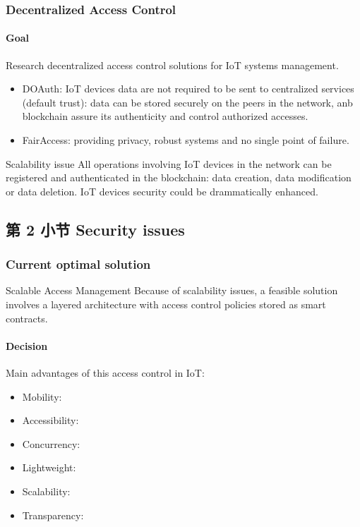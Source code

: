 \documentclass[
    aspectratio=169,                   %
]{beamer}
\begin{document}
    \begin{frame}
        \frametitle{Decentralized Access Control}
        
        \paragraph{Goal} Research decentralized access control solutions for IoT systems management.\cite{ouaddah}

        \begin{itemize}
            \item \alert{DOAuth}: IoT devices data are not required to be sent to centralized services (default trust): data can be stored securely on the peers in the network, anb blockchain assure its authenticity and control authorized accesses.
            \item \alert{FairAccess}: providing privacy, robust systems and no single point of failure.
        \end{itemize}

        \begin{block}{Scalability issue}
            All operations involving IoT devices in the network can be registered and authenticated in the blockchain: data creation, data modification or data deletion. IoT devices security could be drammatically enhanced.
        \end{block}
    \end{frame}

\subsection{第 2 小节 Security issues}

    \begin{frame}
        \frametitle{Current optimal solution}
        
        \begin{block}{Scalable Access Management}
            Because of scalability issues, a feasible solution involves a layered architecture with access control policies stored as smart contracts.\cite{novo}
        \end{block}

        \paragraph{Decision} Main advantages of this access control in IoT:

        \begin{itemize}
            \item \alert{Mobility}: 
            \item \alert{Accessibility}: 
            \item \alert{Concurrency}: 
            \item \alert{Lightweight}: 
            \item \alert{Scalability}: 
            \item \alert{Transparency}: 
        \end{itemize}
    \end{frame}
\end{document}
